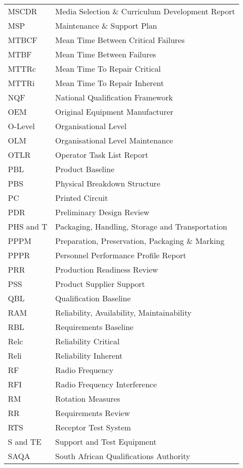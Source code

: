 \begin{longtable}{@{}ll@{}}
		\\
		MSCDR	&	Media Selection \& Curriculum Development Report	\\
		MSP	&	Maintenance \& Support Plan	\\
		MTBCF	&	Mean Time Between Critical Failures	\\
		MTBF	&	Mean Time Between Failures	\\
		MTTRc	&	Mean Time To Repair Critical	\\
		MTTRi	&	Mean Time To Repair Inherent	\\
		NQF	&	National Qualification Framework	\\
		OEM	&	Original Equipment Manufacturer	\\
		O-Level	&	Organisational Level	\\
		OLM	&	Organisational Level Maintenance	\\
		OTLR	&	Operator Task List Report	\\
		PBL	&	Product Baseline	\\
		PBS	&	Physical Breakdown Structure	\\
		PC	&	Printed Circuit	\\
		PDR	&	Preliminary Design Review	\\
		PHS and T&Packaging, Handling, Storage and Transportation	\\
		PPPM	&	Preparation, Preservation, Packaging \& Marking	\\
		PPPR	&	Personnel Performance Profile Report	\\
		PRR	&	Production Readiness Review	\\
		PSS	&	Product Supplier Support	\\
		QBL	&	Qualification Baseline	\\
		RAM	&	Reliability, Availability, Maintainability	\\
		RBL	&	Requirements Baseline	\\
		Relc	&	Reliability Critical	\\
		Reli	&	Reliability Inherent	\\
		RF	&	Radio Frequency	\\
		RFI	&	Radio Frequency Interference	\\
		RM	&	Rotation Measures	\\
		RR	&	Requirements Review	\\
		RTS	&	Receptor Test System	\\
		S and TE	&	Support and Test Equipment	\\
		SAQA	&	South African Qualifications Authority	\\

\end{longtable}
